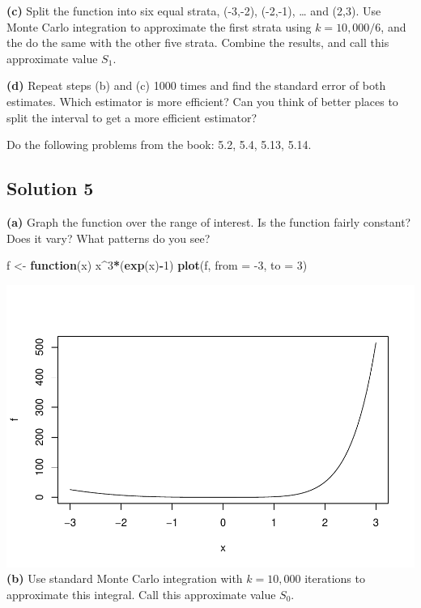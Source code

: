 \documentclass[
]{article}
\newenvironment{Shaded}{\begin{snugshade}}{\end{snugshade}}
\newcommand{\ControlFlowTok}[1]{\textcolor[rgb]{0.13,0.29,0.53}{\textbf{#1}}}
\newcommand{\DataTypeTok}[1]{\textcolor[rgb]{0.13,0.29,0.53}{#1}}
\newcommand{\DecValTok}[1]{\textcolor[rgb]{0.00,0.00,0.81}{#1}}
\newcommand{\KeywordTok}[1]{\textcolor[rgb]{0.13,0.29,0.53}{\textbf{#1}}}
\newcommand{\NormalTok}[1]{#1}
\newcommand{\OperatorTok}[1]{\textcolor[rgb]{0.81,0.36,0.00}{\textbf{#1}}}
\newcommand{\StringTok}[1]{\textcolor[rgb]{0.31,0.60,0.02}{#1}}
\begin{document}
\textbf{(c)} Split the function into six equal strata, (-3,-2), (-2,-1),
\ldots{} and (2,3). Use Monte Carlo integration to approximate the first
strata using \(k=10,000/6\), and the do the same with the other five
strata. Combine the results, and call this approximate value \(S_1\).

\textbf{(d)} Repeat steps (b) and (c) 1000 times and find the standard
error of both estimates. Which estimator is more efficient? Can you
think of better places to split the interval to get a more efficient
estimator?

Do the following problems from the book: 5.2, 5.4, 5.13, 5.14.

\hypertarget{solution-5}{%
\subsection{Solution 5}\label{solution-5}}

\textbf{(a)} Graph the function over the range of interest. Is the
function fairly constant? Does it vary? What patterns do you see?

\begin{Shaded}
\begin{Highlighting}[]
\NormalTok{f <-}\StringTok{ }\ControlFlowTok{function}\NormalTok{(x) x}\OperatorTok{^}\DecValTok{3}\OperatorTok{*}\NormalTok{(}\KeywordTok{exp}\NormalTok{(x)}\OperatorTok{-}\DecValTok{1}\NormalTok{)}
\KeywordTok{plot}\NormalTok{(f, }\DataTypeTok{from =} \DecValTok{-3}\NormalTok{, }\DataTypeTok{to =} \DecValTok{3}\NormalTok{)}
\end{Highlighting}
\end{Shaded}

\includegraphics{hw03_yutingd3_files/figure-latex/unnamed-chunk-12-1.pdf}
\textbf{(b)} Use standard Monte Carlo integration with \(k = 10,000\)
iterations to approximate this integral. Call this approximate value
\(S_0\).
\end{document}
